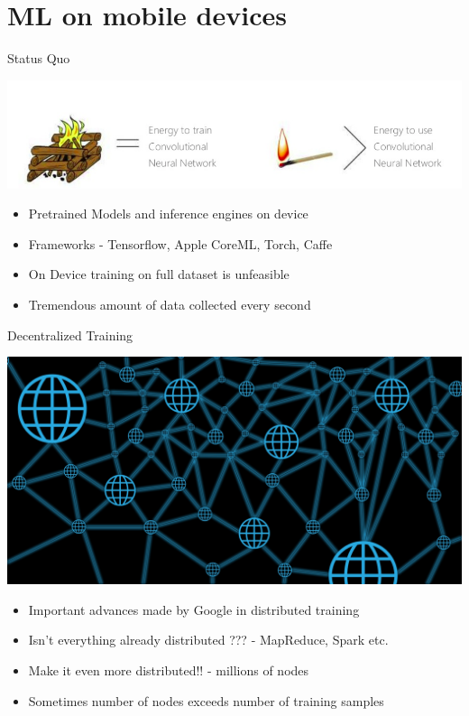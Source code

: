 \documentclass[10pt]{beamer}
\begin{document}
\section{ML on mobile devices}
\begin{frame}{Status Quo}
  \begin{center}
    \includegraphics[height=0.23\textwidth]{cnn_energy.png}
  \end{center}
  \begin{itemize}
  \item Pretrained Models and inference engines on device
  \item Frameworks - Tensorflow, Apple CoreML, Torch, Caffe
  \item On Device training on full dataset is unfeasible
  \item Tremendous amount of data collected every second
  \end{itemize}
\end{frame}
\begin{frame}{Decentralized Training}
  \begin{center}
    \includegraphics[height=0.4\textwidth]{decent.jpg}
  \end{center}
  \begin{itemize}
  \item Important advances made by Google in distributed training
  \item Isn't everything already distributed ??? - MapReduce, Spark etc.
  \item Make it even more distributed!! - millions of nodes
  \item Sometimes number of nodes exceeds number of training samples
  \end{itemize}
\end{frame}
\end{document}
